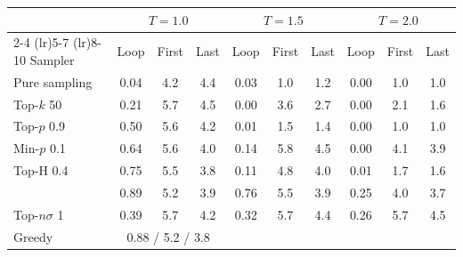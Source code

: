 \begin{tabular}{lccccccccc}
\toprule
 & \multicolumn{3}{c}{$T{=}1.0$} & \multicolumn{3}{c}{$T{=}1.5$} & \multicolumn{3}{c}{$T{=}2.0$} \\
\cmidrule(lr){2-4} \cmidrule(lr){5-7} \cmidrule(lr){8-10}
Sampler & Loop & First & Last & Loop & First & Last & Loop & First & Last \\
\midrule
Pure sampling & 0.04 & 4.2 & 4.4 & 0.03 & 1.0 & 1.2 & 0.00 & 1.0 & 1.0 \\
Top-$k$ 50 & 0.21 & 5.7 & 4.5 & 0.00 & 3.6 & 2.7 & 0.00 & 2.1 & 1.6 \\
Top-$p$ 0.9 & 0.50 & 5.6 & 4.2 & 0.01 & 1.5 & 1.4 & 0.00 & 1.0 & 1.0 \\
Min-$p$ 0.1 & 0.64 & 5.6 & 4.0 & 0.14 & 5.8 & 4.5 & 0.00 & 4.1 & 3.9 \\
Top-H 0.4 & 0.75 & 5.5 & 3.8 & 0.11 & 4.8 & 4.0 & 0.01 & 1.7 & 1.6 \\
\pless{} & 0.89 & 5.2 & 3.9 & 0.76 & 5.5 & 3.9 & 0.25 & 4.0 & 3.7 \\
Top-$n\sigma$ 1 & 0.39 & 5.7 & 4.2 & 0.32 & 5.7 & 4.4 & 0.26 & 5.7 & 4.5 \\
\midrule
Greedy & \multicolumn{3}{c}{0.88 / 5.2 / 3.8} &  &  &  &  &  &  \\
\bottomrule
\end{tabular}
